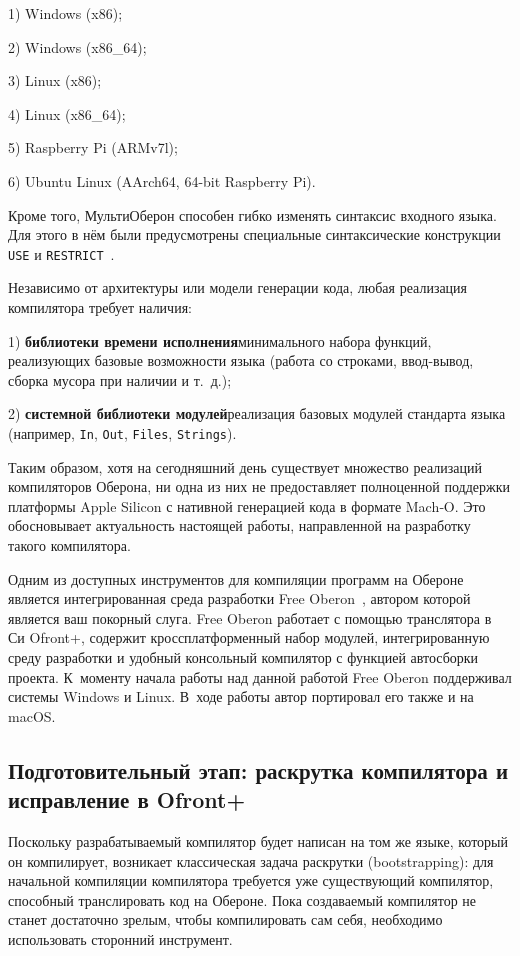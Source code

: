\documentclass[utf8]{lgu}
\newcommand{\tire}{\unskip\nobreak\thinspace\textemdash\thinspace}
\newcommand{\code}[1]{{\normalsize\texttt{#1}}}
\begin{document}
1) Windows (x86);

2) Windows (x86\_64);

3) Linux (x86);

4) Linux (x86\_64);

5) Raspberry Pi (ARMv7l);

6) Ubuntu Linux (AArch64, 64-bit Raspberry Pi).

Кроме того, МультиОберон способен гибко изменять синтаксис входного языка. Для этого в нём были предусмотрены специальные синтаксические конструкции \code{USE} и \code{RESTRICT}~\cite{MultiOberonUseRestrict}.

Независимо от архитектуры или модели генерации кода, любая реализация компилятора требует наличия:

1) \textbf{библиотеки времени исполнения}\tire минимального набора функций, реализующих базовые возможности языка (работа со строками, ввод-вывод, сборка мусора при наличии и т.~д.);

2) \textbf{системной библиотеки модулей}\tire реализация базовых модулей стандарта языка (например, \code{In}, \code{Out}, \code{Files}, \code{Strings}).

Таким образом, хотя на сегодняшний день существует множество реализаций компиляторов Оберона, ни одна из них не предоставляет полноценной поддержки платформы Apple Silicon с нативной генерацией кода в формате Mach‑O. Это обосновывает актуальность настоящей работы, направленной на разработку такого компилятора.

Одним из доступных инструментов для компиляции программ на Обероне является интегрированная среда разработки Free Oberon~\cite{FreeOberonWeb}, автором которой является ваш покорный слуга. Free Oberon работает с помощью транслятора в Си Ofront+, содержит кроссплатформенный набор модулей, интегрированную среду разработки и удобный консольный компилятор с функцией автосборки проекта. К~моменту начала работы над данной работой Free Oberon поддерживал системы Windows и Linux. В~ходе работы автор портировал его также и на macOS.

\subsection{Подготовительный этап: раскрутка компилятора и исправление в Ofront+}

\firstparskip Поскольку разрабатываемый компилятор будет написан на том же языке, который он компилирует, возникает классическая задача раскрутки (bootstrapping): для начальной компиляции компилятора требуется уже существующий компилятор, способный транслировать код на Обероне. Пока создаваемый компилятор не станет достаточно зрелым, чтобы компилировать сам себя, необходимо использовать сторонний инструмент.
\end{document}
